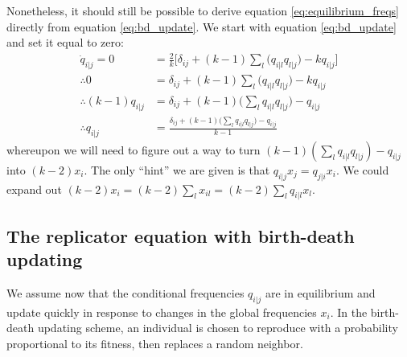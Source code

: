 \documentclass[14pt, a4paper, justified]{article}
\begin{document}
Nonetheless, it should still be possible to derive equation \ref{eq:equilibrium_freqs} directly from equation \ref{eq:bd_update}.
We start with equation \ref{eq:bd_update} and set it equal to zero:
\begin{equation}
    \begin{split}
        \dot{q}_{i|j} = 0 & = \frac{2}{k} \Big[ \delta_{ij} + (k-1)\sum_l \Big( q_{i|l}q_{l|j} \Big) - kq_{i|j} \Big]
        \\
        \therefore 0 & = \delta_{ij} + (k-1)\sum_l \Big( q_{i|l}q_{l|j} \Big) - kq_{i|j}
        \\
        \therefore (k-1)q_{i|j} & = \delta_{ij} + (k-1)\Big( \sum_l q_{i|l}q_{l|j} \Big) - q_{i|j}
        \\
        \therefore q_{i|j} & = \frac{\delta_{ij} + (k-1)\Big( \sum_l q_{i|l}q_{l|j} \Big) - q_{i|j}}{k-1}
    \end{split}
\end{equation}
whereupon we will need to figure out a way to turn $(k-1)(\sum_l q_{i|l}q_{l|j}) - q_{i|j}$ into $(k-2)x_i$.
The only ``hint'' we are given is that $q_{i|j}x_j = q_{j|i}x_i$.
We could expand out $(k-2)x_i = (k-2)\sum_l x_{il} = (k-2)\sum_l q_{i|l} x_l$.

\subsection{The replicator equation with birth-death updating}

We assume now that the conditional frequencies $q_{i|j}$ are in equilibrium and update quickly in response to changes in the global frequencies $x_i$.
In the birth-death updating scheme, an individual is chosen to reproduce with a probability proportional to its fitness, then replaces a random neighbor.
\end{document}
